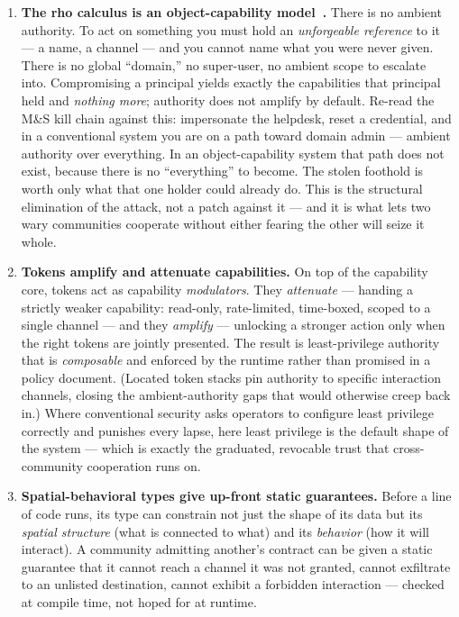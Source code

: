 \documentclass[11pt]{article}
\begin{document}
\begin{enumerate}[leftmargin=1.4em, itemsep=9pt]
  \item \textbf{The rho calculus is an object-capability model~\cite{dennisVanHorn,miller}.} There is no ambient authority. To act on something you must hold an \emph{unforgeable reference} to it --- a name, a channel --- and you cannot name what you were never given. There is no global ``domain,'' no super-user, no ambient scope to escalate into. Compromising a principal yields exactly the capabilities that principal held and \emph{nothing more}; authority does not amplify by default. Re-read the M\&S kill chain against this: impersonate the helpdesk, reset a credential, and in a conventional system you are on a path toward domain admin --- ambient authority over everything. In an object-capability system that path does not exist, because there is no ``everything'' to become. The stolen foothold is worth only what that one holder could already do. This is the structural elimination of the attack, not a patch against it --- and it is what lets two wary communities cooperate without either fearing the other will seize it whole.
  \item \textbf{Tokens amplify and attenuate capabilities.} On top of the capability core, tokens act as capability \emph{modulators}. They \emph{attenuate} --- handing a strictly weaker capability: read-only, rate-limited, time-boxed, scoped to a single channel --- and they \emph{amplify} --- unlocking a stronger action only when the right tokens are jointly presented. The result is least-privilege authority that is \emph{composable} and enforced by the runtime rather than promised in a policy document. (Located token stacks pin authority to specific interaction channels, closing the ambient-authority gaps that would otherwise creep back in.) Where conventional security asks operators to configure least privilege correctly and punishes every lapse, here least privilege is the default shape of the system --- which is exactly the graduated, revocable trust that cross-community cooperation runs on.
  \item \textbf{Spatial-behavioral types give up-front static guarantees.} Before a line of code runs, its type can constrain not just the shape of its data but its \emph{spatial structure} (what is connected to what) and its \emph{behavior} (how it will interact). A community admitting another's contract can be given a static guarantee that it cannot reach a channel it was not granted, cannot exfiltrate to an unlisted destination, cannot exhibit a forbidden interaction --- checked at compile time, not hoped for at runtime.
\end{enumerate}
\end{document}

